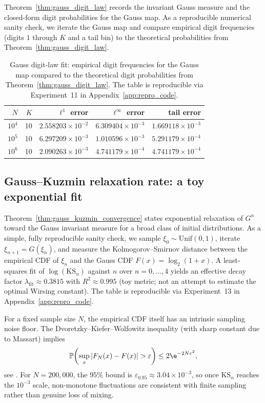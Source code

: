 Theorem~\ref{thm:gauss_digit_law} records the invariant Gauss measure and the closed-form digit probabilities for the Gauss map. As a reproducible numerical sanity check, we iterate the Gauss map and compare empirical digit frequencies (digits $1$ through $K$ and a tail bin) to the theoretical probabilities from Theorem~\ref{thm:gauss_digit_law}.

\begin{table}[H]
\centering
\begin{tabular}{rrrrr}
\toprule
$N$ & $K$ & $\ell^1$ error & $\ell^\infty$ error & tail error \\
\midrule
$10^4$   & 10 & $2.558203\times 10^{-2}$ & $6.309404\times 10^{-3}$ & $1.669118\times 10^{-3}$ \\
$10^5$   & 10 & $6.297209\times 10^{-3}$ & $1.010596\times 10^{-3}$ & $5.291179\times 10^{-4}$ \\
$10^6$   & 10 & $2.090263\times 10^{-3}$ & $4.741179\times 10^{-4}$ & $4.741179\times 10^{-4}$ \\
\bottomrule
\end{tabular}
\caption{Gauss digit-law fit: empirical digit frequencies for the Gauss map compared to the theoretical digit probabilities from Theorem~\ref{thm:gauss_digit_law}. The table is reproducible via Experiment~11 in Appendix~\ref{app:repro_code}.}
\label{tab:gauss_digit_fit}
\end{table}

\subsection{Gauss--Kuzmin relaxation rate: a toy exponential fit}
\label{app:quant_fits_gauss_kuzmin}

Theorem~\ref{thm:gauss_kuzmin_convergence} states exponential relaxation of $G^n$ toward the Gauss invariant measure for a broad class of initial distributions. As a simple, fully reproducible sanity check, we sample $\xi_0\sim \mathrm{Unif}(0,1)$, iterate $\xi_{n+1}=G(\xi_n)$, and measure the Kolmogorov--Smirnov distance between the empirical CDF of $\xi_n$ and the Gauss CDF $F(x)=\log_2(1+x)$. A least-squares fit of $\log(\mathrm{KS}_n)$ against $n$ over $n=0,\ldots,4$ yields an effective decay factor $\lambda_{\mathrm{fit}}\approx 0.3815$ with $R^2\approx 0.995$ (toy metric; not an attempt to estimate the optimal Wirsing constant). The table is reproducible via Experiment~13 in Appendix~\ref{app:repro_code}.
\par
For a fixed sample size $N$, the empirical CDF itself has an intrinsic sampling noise floor. The Dvoretzky--Kiefer--Wolfowitz inequality (with sharp constant due to Massart) implies
\begin{equation}
\mathbb{P}\!\left(\sup_x |F_N(x)-F(x)|>\varepsilon\right)\le 2\e^{-2N\varepsilon^2},
\end{equation}
see \cite{DvoretzkyKieferWolfowitz1956,Massart1990}. For $N=200{,}000$, the $95\%$ bound is $\varepsilon_{0.95}\approx 3.04\times 10^{-3}$, so once $\mathrm{KS}_n$ reaches the $10^{-3}$ scale, non-monotone fluctuations are consistent with finite sampling rather than genuine loss of mixing.

